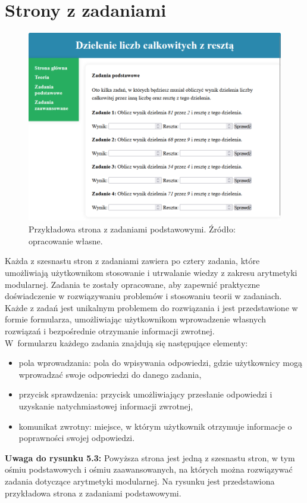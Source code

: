 \documentclass{SGGW-thesis}
\begin{document}
	\section{Strony z zadaniami}
	\begin{figure}[h]
		\centering
		\includegraphics[width=1\textwidth]{zadania.png}
		\caption{Przykładowa strona z zadaniami podstawowymi. Źródło: opracowanie własne.}
		\label{fig:zadania}
	\end{figure}
	\vspace{1em}
	\noindent Każda z szesnastu stron z zadaniami zawiera po cztery zadania, które umożliwiają użytkownikom stosowanie i utrwalanie wiedzy z zakresu arytmetyki modularnej. Zadania te zostały opracowane, aby zapewnić praktyczne doświadczenie w rozwiązywaniu problemów i stosowaniu teorii w zadaniach. Każde z zadań jest unikalnym problemem do rozwiązania i jest przedstawione w formie formularza, umożliwiając użytkownikom wprowadzenie własnych rozwiązań i bezpośrednie otrzymanie informacji zwrotnej.
	\vspace{1em}
	\\
	\noindent W~formularzu każdego zadania znajdują się następujące elementy:
	\begin{itemize}
		\item pola wprowadzania: pola do wpisywania odpowiedzi, gdzie użytkownicy mogą wprowadzać swoje odpowiedzi do danego zadania,
		\item przycisk sprawdzenia: przycisk umożliwiający przesłanie odpowiedzi i uzyskanie natychmiastowej informacji zwrotnej,
		\item komunikat zwrotny: miejsce, w którym użytkownik otrzymuje informacje o poprawności swojej odpowiedzi. 
	\end{itemize}
	\noindent \textbf{Uwaga do rysunku 5.3:} Powyższa strona jest jedną z szesnastu stron, w tym ośmiu podstawowych i ośmiu zaawansowanych, na których można rozwiązywać zadania dotyczące arytmetyki modularnej. Na rysunku jest przedstawiona przykładowa strona z zadaniami podstawowymi.
	\newpage
\end{document}
